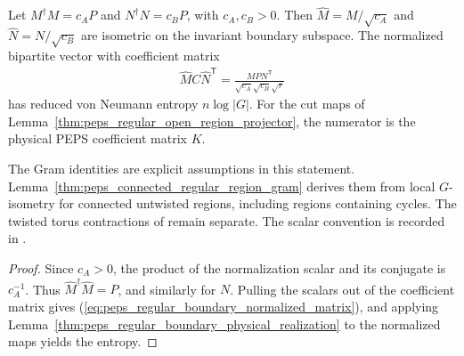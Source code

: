 \begin{lemma}%
    \label{thm:peps_regular_boundary_normalization}
    \leanok
    Let $M^\dagger M=c_AP$ and $N^\dagger N=c_BP$, with $c_A,c_B>0$.
    Then $\widehat M=M/\sqrt{c_A}$ and
    $\widehat N=N/\sqrt{c_B}$ are isometric on the invariant boundary
    subspace. The normalized bipartite vector with coefficient matrix
    \begin{align}
        \widehat M C\widehat N^{\mathsf T}
        =\frac{MPN^{\mathsf T}}{\sqrt{c_A}\sqrt{c_B}\sqrt r}
        \label{eq:peps_regular_boundary_normalized_matrix}
    \end{align}
    has reduced von Neumann entropy $n\log|G|$.
    For the cut maps of
    Lemma~\ref{thm:peps_regular_open_region_projector}, the numerator
    is the physical PEPS coefficient matrix $K$.

    The Gram identities are explicit assumptions in this statement.
    Lemma~\ref{thm:peps_connected_regular_region_gram} derives them
    from local $G$-isometry for connected untwisted regions, including
    regions containing cycles. The twisted torus contractions of
    \cite[Theorem~6.9]{Schuch2010PEPS} remain separate.
    The scalar convention is recorded in
    \cite{gap:rmp_peps_quantum_double_g_isometry}.
\end{lemma}
\begin{proof}\leanok
    Since $c_A>0$, the product of the normalization scalar and its
    conjugate is $c_A^{-1}$. Thus
    $\widehat M^\dagger\widehat M=P$, and similarly for $N$.
    Pulling the scalars out of the coefficient matrix gives
    (\ref{eq:peps_regular_boundary_normalized_matrix}), and applying
    Lemma~\ref{thm:peps_regular_boundary_physical_realization} to the
    normalized maps yields the entropy.
\end{proof}

